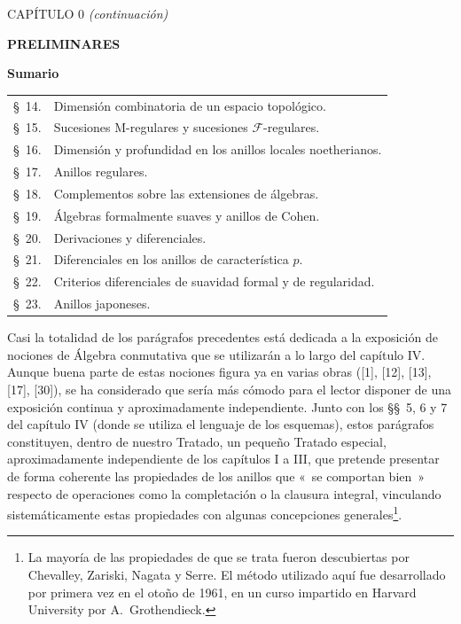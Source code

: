 \clearpage
\thispagestyle{plain}
\label{chapter:0IV1-fr}

\begin{center}
{\large CAPÍTULO 0 \textit{(continuación)}\footnotemark\par}
\vspace{1.5em}
{\Large\bfseries PRELIMINARES\par}
\vspace{2em}
{\large\bfseries Sumario\par}
\end{center}


\begin{center}
\begin{tabular}{@{}r l@{}}
\S~14. & Dimensión combinatoria de un espacio topológico.\\
\S~15. & Sucesiones M-regulares y sucesiones $\mathscr F$-regulares.\\
\S~16. & Dimensión y profundidad en los anillos locales noetherianos.\\
\S~17. & Anillos regulares.\\
\S~18. & Complementos sobre las extensiones de álgebras.\\
\S~19. & Álgebras formalmente suaves y anillos de Cohen.\\
\S~20. & Derivaciones y diferenciales.\\
\S~21. & Diferenciales en los anillos de característica $p$.\\
\S~22. & Criterios diferenciales de suavidad formal y de regularidad.\\
\S~23. & Anillos japoneses.
\end{tabular}
\end{center}

Casi la totalidad de los parágrafos precedentes está dedicada a la exposición
de nociones de Álgebra conmutativa que se utilizarán a lo largo del capítulo
IV. Aunque buena parte de estas nociones figura ya en varias obras ([1], [12],
[13], [17], [30]), se ha considerado que sería más cómodo para el lector
disponer de una exposición continua y aproximadamente independiente. Junto con
los \S\S~5, 6 y 7 del capítulo IV (donde se utiliza el lenguaje de los
esquemas), estos parágrafos constituyen, dentro de nuestro Tratado, un pequeño
Tratado especial, aproximadamente independiente de los capítulos I a III, que
pretende presentar de forma coherente las propiedades de los anillos que «~se
comportan bien~» respecto de operaciones como la completación o la clausura
integral, vinculando sistemáticamente estas propiedades con algunas
concepciones generales\footnote{La mayoría de las propiedades de que se trata
fueron descubiertas por Chevalley, Zariski, Nagata y Serre. El método utilizado
aquí fue desarrollado por primera vez en el otoño de 1961, en un curso impartido
en Harvard University por A.~Grothendieck.}.

